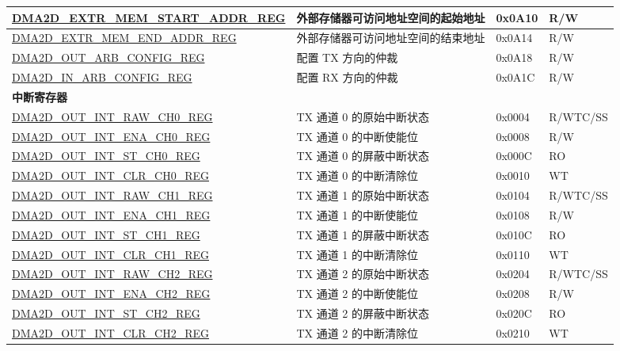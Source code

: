 \begin{longtable}{ | p{7cm} | p{11.5cm} | p{1.3cm} | p{2cm} | }
\hyperref[regdesc:DMA2DEXTRMEMSTARTADDRREG]{DMA2D\_EXTR\_MEM\_START\_ADDR\_REG} & 外部存储器可访问地址空间的起始地址 & 0x0A10 & R/W \\ \hline
\hyperref[regdesc:DMA2DEXTRMEMENDADDRREG]{DMA2D\_EXTR\_MEM\_END\_ADDR\_REG} & 外部存储器可访问地址空间的结束地址 & 0x0A14 & R/W \\ \hline
\hyperref[regdesc:DMA2DOUTARBCONFIGREG]{DMA2D\_OUT\_ARB\_CONFIG\_REG} & 配置 TX 方向的仲裁 & 0x0A18 & R/W \\ \hline
\hyperref[regdesc:DMA2DINARBCONFIGREG]{DMA2D\_IN\_ARB\_CONFIG\_REG} & 配置 RX 方向的仲裁 & 0x0A1C & R/W \\ \hline
\multicolumn{4}{|l|}{\textbf{中断寄存器}} \\ \hline
\hyperref[regdesc:DMA2DOUTINTRAWCHNREG]{DMA2D\_OUT\_INT\_RAW\_CH0\_REG} & TX 通道 0 的原始中断状态 & 0x0004 & R/WTC/SS \\ \hline
\hyperref[regdesc:DMA2DOUTINTENACHNREG]{DMA2D\_OUT\_INT\_ENA\_CH0\_REG} & TX 通道 0 的中断使能位 & 0x0008 & R/W \\ \hline
\hyperref[regdesc:DMA2DOUTINTSTCHNREG]{DMA2D\_OUT\_INT\_ST\_CH0\_REG} & TX 通道 0 的屏蔽中断状态 & 0x000C & RO \\ \hline
\hyperref[regdesc:DMA2DOUTINTCLRCHNREG]{DMA2D\_OUT\_INT\_CLR\_CH0\_REG} & TX 通道 0 的中断清除位 & 0x0010 & WT \\ \hline
\hyperref[regdesc:DMA2DOUTINTRAWCHNREG]{DMA2D\_OUT\_INT\_RAW\_CH1\_REG} & TX 通道 1 的原始中断状态 & 0x0104 & R/WTC/SS \\ \hline
\hyperref[regdesc:DMA2DOUTINTENACHNREG]{DMA2D\_OUT\_INT\_ENA\_CH1\_REG} & TX 通道 1 的中断使能位 & 0x0108 & R/W \\ \hline
\hyperref[regdesc:DMA2DOUTINTSTCHNREG]{DMA2D\_OUT\_INT\_ST\_CH1\_REG} & TX 通道 1 的屏蔽中断状态 & 0x010C & RO \\ \hline
\hyperref[regdesc:DMA2DOUTINTCLRCHNREG]{DMA2D\_OUT\_INT\_CLR\_CH1\_REG} & TX 通道 1 的中断清除位 & 0x0110 & WT \\ \hline
\hyperref[regdesc:DMA2DOUTINTRAWCHNREG]{DMA2D\_OUT\_INT\_RAW\_CH2\_REG} & TX 通道 2 的原始中断状态 & 0x0204 & R/WTC/SS \\ \hline
\hyperref[regdesc:DMA2DOUTINTENACHNREG]{DMA2D\_OUT\_INT\_ENA\_CH2\_REG} & TX 通道 2 的中断使能位 & 0x0208 & R/W \\ \hline
\hyperref[regdesc:DMA2DOUTINTSTCHNREG]{DMA2D\_OUT\_INT\_ST\_CH2\_REG} & TX 通道 2 的屏蔽中断状态 & 0x020C & RO \\ \hline
\hyperref[regdesc:DMA2DOUTINTCLRCHNREG]{DMA2D\_OUT\_INT\_CLR\_CH2\_REG} & TX 通道 2 的中断清除位 & 0x0210 & WT \\ \hline

\end{longtable}
